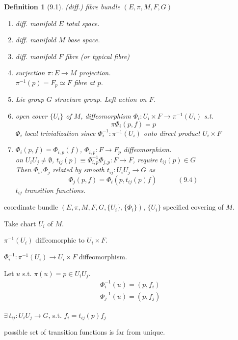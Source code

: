 \documentclass{book}
\newtheorem{definition}{Definition}
\begin{document}
\begin{definition}[9.1] (diff.) fibre bundle $(E, \pi , M, F , G)$ 
\begin{enumerate}
\item[(i)] diff. manifold $E$ total space.  
\item[(ii)] diff. manifold $M$ base space. 
\item[(iii)] diff. manifold $F$ fibre (or typical fibre)
\item[(iv)] surjection $\pi : E \to M$ projection.  \\
\phantom{surjection} $\pi^{-1}(p) = F_p \simeq F$ fibre at $p$.  
\item[(v)] Lie group $G$ structure group.  Left action on $F$.   
\item[(vi)] open cover $\lbrace U_i \rbrace $ of $M$, diffeomorphism $\Phi_i : U_i \times F \to \pi^{-1}(U_i)$ s.t. 
\[
\pi \Phi_i(p, f) = p 
\]
$\Phi_i$ local trivialization since $\Phi_i^{-1} : \pi^{-1}(U_i)$ onto direct product $U_i \times F$
\item[(vii)]  $\Phi_i(p,f) = \Phi_{i,p}(f)$, $\Phi_{i,p} : F \to F_p$ diffeomorphism.  \\
on $U_i U_j \neq \emptyset$, $t_{ij}(p) \equiv \Phi_{i,p}^{-1} \Phi_{j, p } : F \to F$, require $t_{ij}(p) \in G$ \\
Then $\Phi_i, \Phi_j$ related by smooth $t_{ij} : U_i U_j \to G$ as 
\[
\Phi_j(p,f ) = \Phi_i(p,t_{ij}(p) f ) \quad \quad \quad (9.4)
\]
$t_{ij}$ transition functions.  
\end{enumerate}
\end{definition}

coordinate bundle $(E, \pi, M , F, G, \lbrace U_i \rbrace, \lbrace \Phi_i \rbrace)$, $\lbrace U_i \rbrace$ specified covering of $M$.  

Take chart $U_i$ of $M$.  

$\pi^{-1}(U_i)$ diffeomorphic to $U_i \times F$.  

$\Phi_i^{-1} : \pi^{-1}(U_i) \to U_i \times F$ diffeomorphism.  

Let $u$ s.t. $\pi(u) = p \in U_i U_j$.  
\[
\begin{aligned}
  & \Phi_i^{-1}(u) = ( p , f_i ) \\ 
  & \Phi_j^{-1}(u) = ( p , f_j )
\end{aligned}
\]

$\exists \, t_{ij} : U_i U_j \to G$, s.t. $f_i = t_{ij}(p) f_j$


possible set of transition functions is far from unique.  
\end{document}
